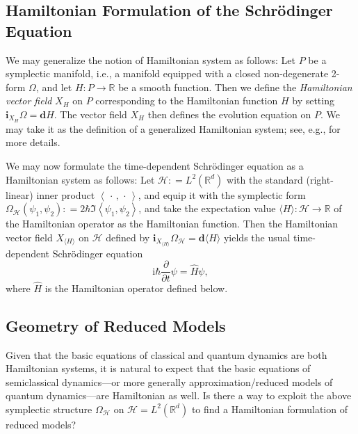 \documentclass[10pt]{article}
\def\defeq{\mathrel{\mathop:}=}
\begin{document}
\subsection{Hamiltonian Formulation of the Schr\"odinger Equation}
We may generalize the notion of Hamiltonian system as follows: Let $P$ be a
symplectic manifold, i.e., a manifold equipped with a closed non-degenerate
2-form $\Omega$, and let $H\colon P \to \mathbb{R}$ be a smooth function. Then
we define the \textit{Hamiltonian vector field} $X_{H}$ on $P$ corresponding to
the Hamiltonian function $H$ by setting $\textbf{i}_{X_H}\Omega =  \textbf{d}H$.
The vector field $X_{H}$ then defines the evolution equation on $P$. We may take
it as the definition of a generalized Hamiltonian system; see, e.g.,
\citet{MaRa1999} for more details.

We may now formulate the time-dependent Schr\"odinger equation as a Hamiltonian
system as follows:
Let $\mathcal{H} \defeq L^2(\mathbb{R}^d)$ with the standard (right-linear)
inner product $\left\langle\,\cdot\,,\,\cdot\,\right\rangle$, and equip it with
the symplectic form
$\Omega_{\mathcal{H}}(\psi_1, \psi_2)  \defeq 2 \hbar \Im \left\langle\psi_1, \psi_2\right\rangle$,
and take the expectation value
$\langle H\rangle\colon \mathcal{H} \to \mathbb{R}$ of the Hamiltonian operator
as the Hamiltonian function. Then the Hamiltonian vector field $X_{\langle H\rangle}$
on $\mathcal{H}$ defined by
$\textbf{i}_{X_{\langle H\rangle}}\Omega_{\mathcal{H}} =  \textbf{d}\langle H\rangle$
yields the usual time-dependent Schr\"odinger equation
\begin{equation}\label{eq:Schroedinger}
  \text{i}\hbar \frac{\partial}{\partial t} \psi = \hat{H} \psi,
\end{equation}
where $\hat{H}$ is the Hamiltonian operator defined below.

\subsection{Geometry of Reduced Models}
Given that the basic equations of classical and quantum dynamics are both
Hamiltonian systems, it is natural to expect that the basic equations of
semiclassical dynamics---or more generally approximation/reduced models of
quantum dynamics---are Hamiltonian as well. Is there a way to exploit the above
symplectic structure $\Omega_{\mathcal{H}}$ on $\mathcal{H} = L^2(\mathbb{R}^d)$
to find a Hamiltonian formulation of reduced models?
\end{document}

